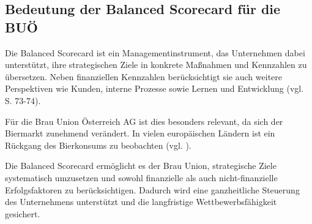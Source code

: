 \subsection{Bedeutung der Balanced Scorecard für die BUÖ}

Die Balanced Scorecard ist ein Managementinstrument, das Unternehmen dabei unterstützt, ihre strategischen Ziele in konkrete Maßnahmen und Kennzahlen zu übersetzen. Neben finanziellen Kennzahlen berücksichtigt sie auch weitere Perspektiven wie Kunden, interne Prozesse sowie Lernen und Entwicklung (vgl. \cite{gadatsch_it-controlling_2026} S. 73-74).

Für die Brau Union Österreich AG ist dies besonders relevant, da sich der Biermarkt zunehmend verändert. In vielen europäischen Ländern ist ein Rückgang des Bierkonsums zu beobachten (vgl. \cite{noauthor_bierabsatz_nodate}).

Die Balanced Scorecard ermöglicht es der Brau Union, strategische Ziele systematisch umzusetzen und sowohl finanzielle als auch nicht-finanzielle Erfolgsfaktoren zu berücksichtigen. Dadurch wird eine ganzheitliche Steuerung des Unternehmens unterstützt und die langfristige Wettbewerbsfähigkeit gesichert.